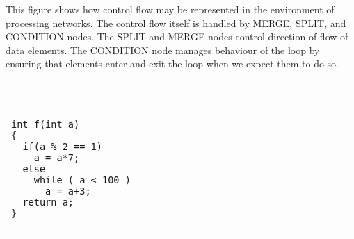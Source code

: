 
\justify
This figure shows how control flow may be represented in the environment of processing networks. The control flow itself is handled by MERGE, SPLIT, and CONDITION nodes. The SPLIT and MERGE nodes control direction of flow of data elements. The CONDITION node manages behaviour of the loop by ensuring that elements enter and exit the loop when we expect them to do so. 

\ 

\begin{center}
\begin{tabular}{ m{10cm} m{23cm} }


\begin{minipage}{15cm}
\begin{verbatim}
int f(int a)
{
  if(a % 2 == 1)
    a = a*7;
  else
    while ( a < 100 )
      a = a+3;
  return a;
}
\end{verbatim}
\end{minipage}
&

\end{tabular}
\end{center}
